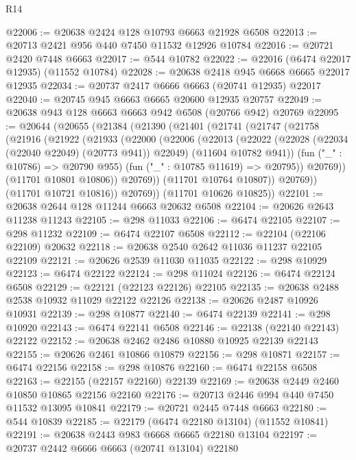 \begin{lexlean}{R14}
\begin{coremodule}
@22006 := @20638 @2424 @128 @10793 @6663 @21928 @6508
@22013 := @20713 @2421 @956 @440 @7450 @11532 @12926 @10784
@22016 := @20721 @2420 @7448 @6663
@22017 := @544 @10782
@22022 := @22016 (@6474 @22017 @12935) (@11552 @10784)
@22028 := @20638 @2418 @945 @6668 @6665 @22017 @12935
@22034 := @20737 @2417 @6666 @6663 (@20741 @12935) @22017
@22040 := @20745 @945 @6663 @6665 @20600 @12935 @20757
@22049 := @20638 @943 @128 @6663 @6663 @942 @6508 (@20766 @942) @20769
@22095 := @20644
    (@20655
      (@21384
        (@21390
          (@21401
            (@21741
              (@21747
                (@21758
                  (@21916
                    (@21922
                      (@21933
                        (@22000
                          (@22006
                            (@22013
                              (@22022
                                (@22028 (@22034 (@22040 @22049) (@20773 @941)) @22049)
                                (@11604 @10782 @941))
                              (fun ("_" : @10786) => @20790 @955)
                              (fun ("_" : @10785 @11619) => @20795))
                            @20769))
                        (@11701 @10801 @10806))
                      @20769))
                  (@11701 @10764 @10807))
                @20769))
            (@11701 @10721 @10816))
          @20769))
      (@11701 @10626 @10825))
@22101 := @20638 @2644 @128 @11244 @6663 @20632 @6508
@22104 := @20626 @2643 @11238 @11243
@22105 := @298 @11033
@22106 := @6474 @22105
@22107 := @298 @11232
@22109 := @6474 @22107 @6508
@22112 := @22104 (@22106 @22109) @20632
@22118 := @20638 @2540 @2642 @11036 @11237 @22105 @22109
@22121 := @20626 @2539 @11030 @11035
@22122 := @298 @10929
@22123 := @6474 @22122
@22124 := @298 @11024
@22126 := @6474 @22124 @6508
@22129 := @22121 (@22123 @22126) @22105
@22135 := @20638 @2488 @2538 @10932 @11029 @22122 @22126
@22138 := @20626 @2487 @10926 @10931
@22139 := @298 @10877
@22140 := @6474 @22139
@22141 := @298 @10920
@22143 := @6474 @22141 @6508
@22146 := @22138 (@22140 @22143) @22122
@22152 := @20638 @2462 @2486 @10880 @10925 @22139 @22143
@22155 := @20626 @2461 @10866 @10879
@22156 := @298 @10871
@22157 := @6474 @22156
@22158 := @298 @10876
@22160 := @6474 @22158 @6508
@22163 := @22155 (@22157 @22160) @22139
@22169 := @20638 @2449 @2460 @10850 @10865 @22156 @22160
@22176 := @20713 @2446 @994 @440 @7450 @11532 @13095 @10841
@22179 := @20721 @2445 @7448 @6663
@22180 := @544 @10839
@22185 := @22179 (@6474 @22180 @13104) (@11552 @10841)
@22191 := @20638 @2443 @983 @6668 @6665 @22180 @13104
@22197 := @20737 @2442 @6666 @6663 (@20741 @13104) @22180

\end{coremodule}
\end{lexlean}
